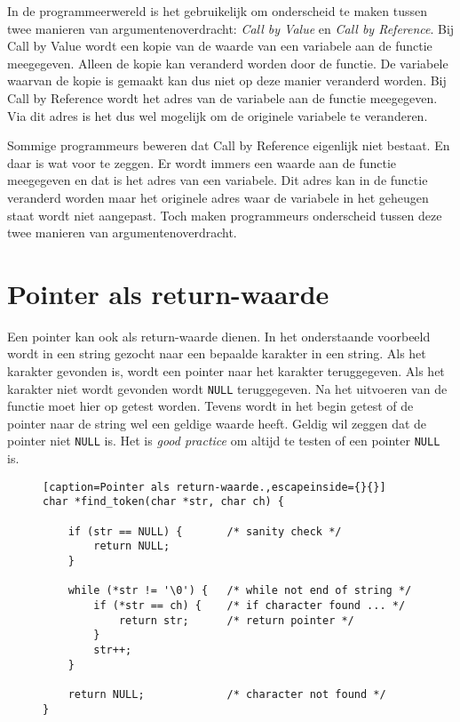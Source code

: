 \begin{infobox}
%
In de programmeerwereld is het gebruikelijk om onderscheid te maken tussen twee manieren van argumentenoverdracht: \textsl{Call by Value} en \textsl{Call by Reference}. Bij Call by Value wordt een kopie van de waarde van een variabele aan de functie meegegeven. Alleen de kopie kan veranderd worden door de functie. De variabele waarvan de kopie is gemaakt kan dus niet op deze manier veranderd worden. Bij Call by Reference wordt het adres van de variabele aan de functie meegegeven. Via dit adres is het dus wel mogelijk om de originele variabele te veranderen.

Sommige programmeurs beweren dat Call by Reference eigenlijk niet bestaat. En daar is wat voor te zeggen. Er wordt immers een waarde aan de functie meegegeven en dat is het adres van een variabele. Dit adres kan in de functie veranderd worden maar het originele adres waar de variabele in het geheugen staat wordt niet aangepast. Toch maken programmeurs onderscheid tussen deze twee manieren van argumentenoverdracht.
\end{infobox}


\section{Pointer als return-waarde}
\label{sec:pointersalsreturnwaarde}
Een pointer kan ook als return-waarde dienen. In het onderstaande voorbeeld wordt in een string gezocht naar een bepaalde karakter in een string. Als het karakter gevonden is, wordt een pointer naar het karakter teruggegeven. Als het karakter niet wordt gevonden wordt \texttt{NULL} teruggegeven. Na het uitvoeren van de functie moet hier op getest worden. Tevens wordt in het begin getest of de pointer naar de string wel een geldige waarde heeft. Geldig wil zeggen dat de pointer niet \texttt{NULL} is. Het is \textsl{good practice} om altijd te testen of een pointer \texttt{NULL} is.

\begin{figure}[!ht]
\begin{lstlisting}[caption=Pointer als return-waarde.,escapeinside={}{}]
char *find_token(char *str, char ch) {

    if (str == NULL) {       /* sanity check */
        return NULL;
    }

    while (*str != '\0') {   /* while not end of string */
        if (*str == ch) {    /* if character found ... */
            return str;      /* return pointer */
        }
        str++;
    }

    return NULL;             /* character not found */
}
\end{lstlisting}
\end{figure}

